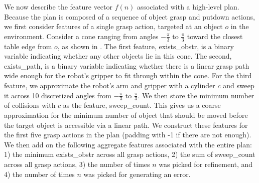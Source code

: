We now describe the feature vector $f(n)$ associated with a high-level plan. Because the plan is composed
of a sequence of object grasp and putdown actions, we first consider features of a single grasp action, targeted
at an object $o$ in the environment. Consider a cone ranging from angles $-\frac{\pi}{3}$ to $\frac{\pi}{3}$
toward the closest table edge from $o$, as shown in . The first feature, exists\_obstr, is a binary variable indicating
whether any other objects lie in this cone. The second, exists\_path, is a binary variable indicating whether there is a linear
grasp path wide enough for the robot's gripper to fit through within the cone. For the third feature, we approximate the robot's arm and gripper with a cylinder $c$ and sweep it across 10 discretized angles from $-\frac{\pi}{3}$ to
$\frac{\pi}{3}$. We then store the minimum number of collisions with $c$ as the feature, sweep\_count. This gives us a coarse approximation for the minimum number of object that should be moved before the target object is accessible via a linear path.
We construct these features for the first five grasp actions in the plan (padding with -1 if there are not enough).
We then add on the following aggregate features associated with the entire plan: 1) the minimum exists\_obstr across all grasp actions,
2) the sum of sweep\_count across all grasp actions, 3) the number of times $n$ was picked for refinement,
and 4) the number of times $n$ was picked for generating an error.